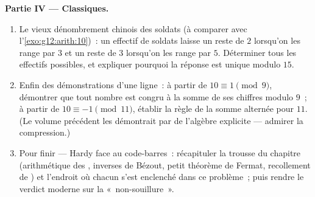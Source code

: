 \begin{problem}
\medskip
\noindent\textbf{Partie IV --- Classiques.}
\begin{enumerate}[resume]
  \item Le vieux dénombrement chinois des soldats (à comparer avec
        l'\cref{exo:g12:arith:10})~: un effectif de soldats laisse
        un reste de $2$ lorsqu'on les range par $3$ et un reste de
        $3$ lorsqu'on les range par $5$. Déterminer tous les
        effectifs possibles, et expliquer pourquoi la réponse est
        unique modulo $15$.
  \item Enfin des démonstrations d'une ligne~: à partir de
        $10 \equiv 1 \pmod 9$, démontrer que tout nombre est
        congru à la somme de ses chiffres modulo $9$~; à partir de
        $10 \equiv -1 \pmod{11}$, établir la règle de la somme
        alternée pour $11$. (Le volume précédent les démontrait par
        de l'algèbre explicite --- admirer la compression.)
  \item Pour finir --- Hardy face au code-barres~: récapituler la
        trousse du chapitre (arithmétique des , inverses
        de Bézout, petit théorème de Fermat, recollement de 
        ) et l'endroit où chacun s'est enclenché
        dans ce problème~; puis rendre le verdict moderne sur la
        «~non-souillure~».
\end{enumerate}
\end{problem}
